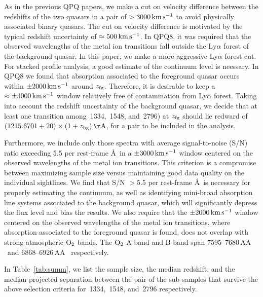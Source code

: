 \documentclass[iop]{emulateapj}
\begin{document}
As in the previous QPQ papers, we make a cut on velocity difference between the redshifts of the 
two quasars in a pair of $>3000\,{\rm km\,s^{-1}}$ to avoid physically associated binary quasars. 
The cut on velocity difference is motivated by the typical redshift uncertainty of 
$\approx500\,{\rm km\,s^{-1}}$. In QPQ8, it was required that the observed wavelengths of the 
metal ion transitions fall outside the Ly$\alpha$ forest of the background quasar. In this paper, 
we make a more aggressive Ly$\alpha$ forest cut. For stacked profile analysis, a good estimate of 
the continuum level is neessary. In QPQ8 we found that absorption associated to 
the foreground quasar occurs within $\pm2000\,{\rm km\,s^{-1}}$ around $z_{\rm fg}$. Therefore, it 
is desirable to keep a $\approx\pm3000\,{\rm km\,s^{-1}}$ window relatively free of contamination 
from Ly$\alpha$ forest. Taking into account the redshift uncertainty of the background quasar, 
we decide that at least one transition among \,1334, \,1548, and 
\,2796) at $z_{\rm fg}$ should lie redward of 
$(1215.6701+20)\times(1+z_{\rm bg})\,{\rm \AA}$, for a pair to be included in the analysis. 

Furthermore, we include only those spectra with average signal-to-noise (S/N) ratio exceeding 5.5 
per rest-frame \AA \ in a $\pm3000\,{\rm km\,s^{-1}}$ window centered on the observed wavelengths 
of the metal ion transitions. This criterion is a compromise between maximizing sample size versus 
maintaining good data quality on the individual sightlines. We find that S/N $>5.5$ per rest-frame 
\AA \ is 
necessary for properly estimating the continuum, as well as identifying mini-broad absorption line 
systems associated to the background quasar, which will significantly depress the flux level and 
bias the results. We also require that the $\pm2000\,{\rm km\,s^{-1}}$ window centered on the 
observed wavelengths of the metal ion transitions, where absorption associated to the foreground 
quasar is found, does not overlap with strong atmospheric ${\rm O}_2$ bands. The ${\rm O}_2$ 
A-band and B-band span 7595\textrm{--}7680\,AA \ and 6868\textrm{--}6926\,AA \ respectively. 

In Table~\ref{tab:summ}, we list the sample size, the median redshift, and the median projected 
separation between the pair of the sub-samples that survive the above selection criteria for 
\,1334, \,1548, and \,2796 respectively. 
\end{document}
